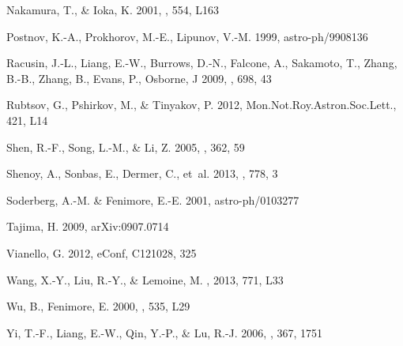 \documentclass[manuscript]{aastex}
\begin{document}
\begin{thebibliography}{}
Nakamura, T., \& Ioka, K. 2001, \apj, 554, L163

Postnov, K.-A., Prokhorov, M.-E., Lipunov, V.-M. 1999, astro-ph/9908136

Racusin, J.-L., Liang, E.-W., Burrows, D.-N., Falcone, A., Sakamoto, T., Zhang, B.-B., Zhang, B., Evans, P., Osborne, J 2009, \apj, 698, 43

Rubtsov, G., Pshirkov, M., \& Tinyakov, P. 2012, Mon.Not.Roy.Astron.Soc.Lett.,
  421, L14

Shen, R.-F., Song, L.-M., \& Li, Z. 2005, \mnras, 362, 59

Shenoy, A., Sonbas, E., Dermer, C., {et~al.} 2013, \apj, 778, 3

Soderberg, A.-M. \& Fenimore, E.-E. 2001, astro-ph/0103277

Tajima, H. 2009, arXiv:0907.0714

Vianello, G. 2012, eConf, C121028, 325

Wang, X.-Y., Liu, R.-Y., \& Lemoine, M. \apj, 2013, 771, L33

Wu, B., Fenimore, E. 2000, \apj, 535, L29

Yi, T.-F., Liang, E.-W., Qin, Y.-P., \& Lu, R.-J. 2006,
  \mnras, 367, 1751

\end{thebibliography}
\end{document}
